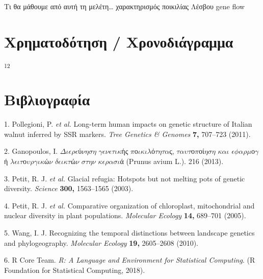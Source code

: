 \documentclass[12pt,a4paper,]{report}
\begin{document}
Τι θα μάθουμε από αυτή τη μελέτη\ldots{} χαρακτηρισμός ποικιλίας Λέσβου
gene flow

\hypertarget{-}{%
\section{Χρηματοδότηση / Χρονοδιάγραμμα}\label{-}}

\textsuperscript{12}

\section{Βιβλιογραφία}

\hypertarget{refs}{}
\leavevmode\hypertarget{ref-Pollegioni2011}{}%
1. Pollegioni, P. \emph{et al.} Long-term human impacts on genetic
structure of Italian walnut inferred by SSR markers. \emph{Tree Genetics
\& Genomes} \textbf{7,} 707--723 (2011).

\leavevmode\hypertarget{ref-Ganopoulos2013}{}%
2. Ganopoulos, I.
\(\Delta\)\(\iota\)\(\epsilon\)\(\rho\)\(\epsilon\)ύ\(\nu\)\(\eta\)\(\sigma\)\(\eta\)
\(\gamma\)\(\epsilon\)\(\nu\)\(\epsilon\)\(\tau\)\(\iota\)\(\kappa\)ής
\(\pi\)ο\(\iota\)\(\kappa\)\(\iota\)\(\lambda\)ό\(\tau\)\(\eta\)\(\tau\)\(\alpha\)ς,
\(\tau\)\(\alpha\)\(\upsilon\)\(\tau\)ο\(\pi\)οί\(\eta\)\(\sigma\)\(\eta\)
\(\kappa\)\(\alpha\)\(\iota\)
\(\epsilon\)\(\phi\)\(\alpha\)\(\rho\)\(\mu\)ο\(\gamma\)ή
\(\lambda\)\(\epsilon\)\(\iota\)\(\tau\)ο\(\upsilon\)\(\rho\)\(\gamma\)\(\iota\)\(\kappa\)ώ\(\nu\)
\(\delta\)\(\epsilon\)\(\iota\)\(\kappa\)\(\tau\)ώ\(\nu\)
\(\sigma\)\(\tau\)\(\eta\)\(\nu\)
\(\kappa\)\(\epsilon\)\(\rho\)\(\alpha\)\(\sigma\)\(\iota\)ά (Prunus
avium L.). 216 (2013).

\leavevmode\hypertarget{ref-Petit2003}{}%
3. Petit, R. J. \emph{et al.} Glacial refugia: Hotspots but not melting
pots of genetic diversity. \emph{Science} \textbf{300,} 1563--1565
(2003).

\leavevmode\hypertarget{ref-Petit2005}{}%
4. Petit, R. J. \emph{et al.} Comparative organization of chloroplast,
mitochondrial and nuclear diversity in plant populations.
\emph{Molecular Ecology} \textbf{14,} 689--701 (2005).

\leavevmode\hypertarget{ref-Wang2010a}{}%
5. Wang, I. J. Recognizing the temporal distinctions between landscape
genetics and phylogeography. \emph{Molecular Ecology} \textbf{19,}
2605--2608 (2010).

\leavevmode\hypertarget{ref-RCoreTeam2018}{}%
6. R Core Team. \emph{R: A Language and Environment for Statistical
Computing}. (R Foundation for Statistical Computing, 2018).
\end{document}
